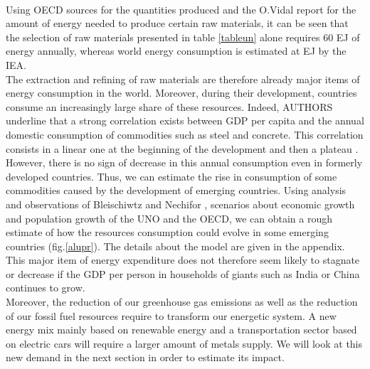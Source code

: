 \documentclass[conference]{IEEEtran}
\begin{document}
\\
Using OECD sources for the quantities produced and the O.Vidal report for the amount of energy needed to produce certain raw materials, it can be seen that the selection of raw materials presented in table \ref{tableun} alone requires 60 EJ of energy annually, whereas world energy consumption is estimated at EJ by the IEA. 
\\
The extraction and refining of raw materials are therefore already major items of energy consumption in the world. Moreover, during their development, countries consume an increasingly large share of these resources. Indeed, AUTHORS underline that a strong correlation exists between GDP per capita and the annual domestic consumption of commodities such as steel and concrete. This correlation consists in a linear one at the beginning of the development and then a plateau \cite{bleischwitz_extrapolation_2018}. However, there is no sign of decrease in this annual consumption even in formerly developed countries. Thus, we can estimate the rise in consumption of some commodities caused by the development of emerging countries. Using analysis and observations of Bleischiwtz and Nechifor \cite{bleischwitz_extrapolation_2018}, scenarios about economic growth and population growth of the UNO \cite{noauthor_oecd_2021}\cite{noauthor_2019_2019} and the OECD, we can obtain a rough estimate of how the resources consumption could evolve in some emerging countries (fig.\ref{alupr}). The details about the model are given in the appendix. 
\\
This major item of energy expenditure does not therefore seem likely to stagnate or decrease if the GDP per person in households of giants such as India or China continues to grow. 
\\
Moreover, the reduction of our greenhouse gas emissions as well as the reduction of our fossil fuel resources require to transform our energetic system. A new energy mix mainly based on renewable energy and a transportation sector based on electric cars will require a larger amount of metals supply. We will look at this new demand in the next section in order to estimate its impact. 
\end{document}
